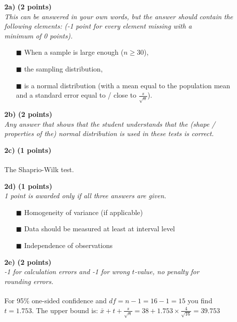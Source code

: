 \begin{itemize}
\item[\textbf{2a)}] \textbf{(2 points)} \\
     \textit{This can be answered in your own words, but the answer should contain the following elements: (-1 point for every element missing with a \\minimum of 0 points).} \\
    \begin{itemize}
        \item[$\blacksquare$] When a sample is large enough ($n \geq 30$),        
        \item[$\blacksquare$] the sampling distribution,
        \item[$\blacksquare$] is a normal distribution (with a mean equal to the population mean and a standard error equal to / close to $\frac{s}{\sqrt{n}}$).
    \end{itemize}
\item[\textbf{2b)}] \textbf{(2 points)} \\
     \textit{Any answer that shows that the student understands that the (shape / properties of the) normal distribution is used in these tests is correct.} \\
\item[\textbf{2c)}] \textbf{(1 points)} \\ \\
     The Shaprio-Wilk test. \\
\item[\textbf{2d)}] \textbf{(1 points)} \\
     \textit{1 point is awarded only if all three answers are given.} \\
    \begin{itemize}
        \item[$\blacksquare$] Homogeneity of variance (if applicable)
        \item[$\blacksquare$] Data should be measured at least at interval level
        \item[$\blacksquare$] Independence of observations
    \end{itemize}
\item[\textbf{2e)}] \textbf{(2 points)} \\
     \textit{-1 for calculation errors and -1 for wrong $t$-value, no penalty for \\rounding errors.} \\ 
     \\
     For 95\% one-sided confidence and $df = n - 1 = 16 - 1 = 15$ you find $t = 1.753$. The upper bound is: $\bar{x} + t + \frac{s}{\sqrt{n}} = 38 + 1.753 \times \frac{4}{\sqrt{16}} = 39.753$ \\

\end{itemize}
